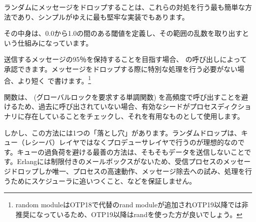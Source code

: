 ランダムにメッセージをドロップすることは、これらの対処を行う最も簡単な方法であり、シンプルがゆえに最も堅牢な実装でもあります。

その中身は、0.0から1.0の間のある閾値を定義し、その範囲の乱数を取り出すという仕組みになっています。


送信するメッセージの95％を保持することを目指す場合、  の呼び出しによって承認できます。メッセージをドロップする際に特別な処理を行う必要がない場合、より短く  で書けます。\footnote{random moduleはOTP18で代替のrand moduleが追加されOTP19以降では非推奨になっているため、OTP19以降はrandを使った方が良いでしょう。}

関数は、 (グローバルロックを要求する単調関数) を高頻度で呼び出すことを避けるため、過去に呼び出されていない場合、有効なシードがプロセスディクショナリに存在していることをチェックし、それを有用なものとして使用します。

しかし、この方法には1つの「落とし穴」があります。ランダムドロップは、キュー（レシーバ）レイヤではなくプロデューサレイヤで行うのが理想的なのです。キューの過負荷を避ける最善の方法は、そもそもデータを送信しないことです。Erlangには制限付きのメールボックスがないため、受信プロセスのメッセージドロップしか唯一、プロセスの高速動作、メッセージ除去への試み、処理を行うためにスケジューラに追いつくこと、などを保証しません。

